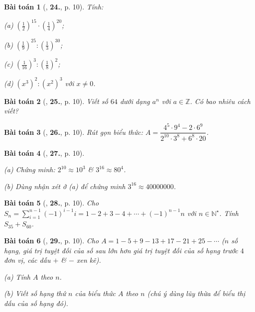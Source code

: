 \documentclass{article}
\numberwithin{equation}{section}
\newtheorem{baitoan}{Bài toán}[section]
\begin{document}
\begin{baitoan}[\cite{Binh_Toan_7_tap_1}, \textbf{24.}, p. 10]
	Tính:
	\begin{enumerate*}
		\item[(a)] $\left(\frac{1}{2}\right)^{15}\cdot\left(\frac{1}{4}\right)^{20}$;
		\item[(b)] $\left(\frac{1}{9}\right)^{25}:\left(\frac{1}{3}\right)^{30}$;
		\item[(c)] $\left(\frac{1}{16}\right)^3:\left(\frac{1}{8}\right)^2$;
		\item[(d)] $(x^3)^2:(x^2)^3$ với $x\ne 0$.
	\end{enumerate*}
\end{baitoan}

\begin{baitoan}[\cite{Binh_Toan_7_tap_1}, \textbf{25.}, p. 10]
	Viết số $64$ dưới dạng $a^n$ với $a\in\mathbb{Z}$. Có bao nhiêu cách viết?
\end{baitoan}

\begin{baitoan}[\cite{Binh_Toan_7_tap_1}, \textbf{26.}, p. 10]
	Rút gọn biểu thức: $A = \dfrac{4^5\cdot 9^4 - 2\cdot 6^9}{2^{10}\cdot 3^8 + 6^8\cdot 20}$.
\end{baitoan}

\begin{baitoan}[\cite{Binh_Toan_7_tap_1}, \textbf{27.}, p. 10]
	\begin{enumerate*}
		\item[(a)] Chứng minh: $2^{10}\approx 10^3$ \& $3^{16}\approx 80^4$.
		\item[(b)] Dùng nhận xét ở (a) để chứng minh $3^{16}\approx 40000000$.
	\end{enumerate*}
\end{baitoan}

\begin{baitoan}[\cite{Binh_Toan_7_tap_1}, \textbf{28.}, p. 10]
	Cho $S_n = \sum_{i=1}^{n-1} (-1)^{i-1}i = 1 - 2 + 3 - 4 + \cdots + (-1)^{n-1}n$ với $n\in\mathbb{N}^\star$. Tính $S_{35} + S_{60}$.
\end{baitoan}

\begin{baitoan}[\cite{Binh_Toan_7_tap_1}, \textbf{29.}, p. 10]
	Cho $A = 1 - 5 + 9 - 13 + 17 - 21 + 25 - \cdots$ ($n$ số hạng, giá trị tuyệt đối của số sau lớn hơn giá trị tuyệt đối của số hạng trước $4$ đơn vị, các dấu $+$ \& $-$ xen kẽ).
	\begin{enumerate*}
		\item[(a)] Tính $A$ theo $n$.
		\item[(b)] Viết số hạng thứ $n$ của biểu thức $A$ theo $n$ (chú ý dùng lũy thừa để biểu thị dấu của số hạng đó).
	\end{enumerate*}
\end{baitoan}
\end{document}
